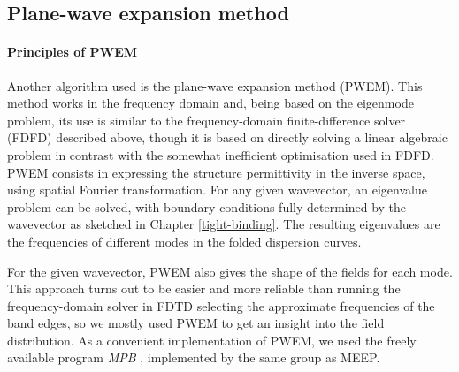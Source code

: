 \subsection{Plane-wave expansion method} %
\paragraph{Principles of PWEM} %
Another algorithm used is the plane-wave expansion method (PWEM). This method works in the frequency domain and, being based on the eigenmode problem, its use is similar to the frequency-domain finite-difference solver (FDFD) described above, though it is based on directly solving a linear algebraic problem in contrast with the somewhat inefficient optimisation used in FDFD.
PWEM consists in expressing the structure permittivity in the inverse space, using spatial Fourier transformation. For any given wavevector, an eigenvalue problem can be solved, with boundary conditions fully determined by the wavevector as sketched in Chapter \ref{tight-binding}. The resulting eigenvalues are the frequencies of different modes in the folded dispersion curves.  


For the given wavevector, PWEM also gives the shape of the fields for each mode. This approach turns out to be easier and more reliable than running the frequency-domain solver in FDTD selecting the approximate frequencies of the band edges, so we mostly used PWEM to get an insight into the field distribution. 
As a convenient implementation of PWEM, we used the freely available program \textit{MPB} \cite{johnson2001mpb}, implemented by the same group as MEEP.


